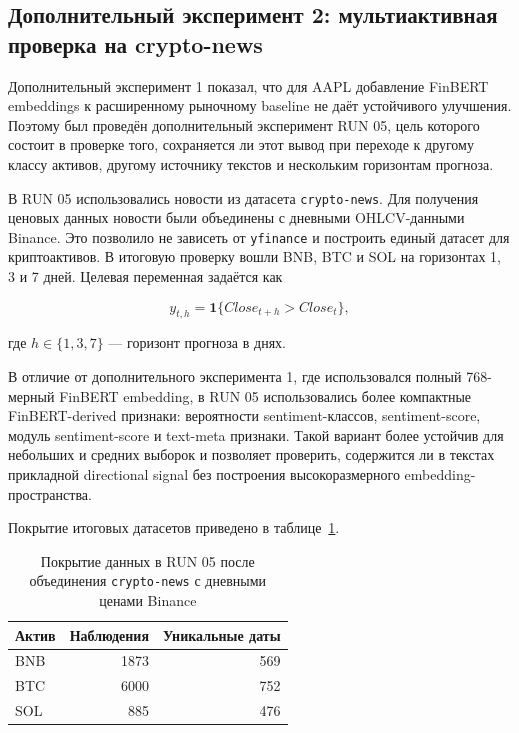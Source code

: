 \subsection{Дополнительный эксперимент 2: мультиактивная проверка на crypto-news}

Дополнительный эксперимент 1 показал, что для AAPL добавление FinBERT embeddings к расширенному рыночному baseline не даёт устойчивого улучшения. Поэтому был проведён дополнительный эксперимент RUN 05, цель которого состоит в проверке того, сохраняется ли этот вывод при переходе к другому классу активов, другому источнику текстов и нескольким горизонтам прогноза.

В RUN 05 использовались новости из датасета \texttt{crypto-news}. Для получения ценовых данных новости были объединены с дневными OHLCV-данными Binance. Это позволило не зависеть от \texttt{yfinance} и построить единый датасет для криптоактивов. В итоговую проверку вошли BNB, BTC и SOL на горизонтах 1, 3 и 7 дней. Целевая переменная задаётся как

\[
y_{t,h}=\mathbf{1}\{Close_{t+h}>Close_t\},
\]

где $h \in \{1,3,7\}$ --- горизонт прогноза в днях.

В отличие от дополнительного эксперимента 1, где использовался полный 768-мерный FinBERT embedding, в RUN 05 использовались более компактные FinBERT-derived признаки: вероятности sentiment-классов, sentiment-score, модуль sentiment-score и text-meta признаки. Такой вариант более устойчив для небольших и средних выборок и позволяет проверить, содержится ли в текстах прикладной directional signal без построения высокоразмерного embedding-пространства.

Покрытие итоговых датасетов приведено в таблице~\ref{tab:run05_coverage}.

\begin{table}[htbp]
\centering
\begin{tabular}{lrr}
\toprule
Актив & Наблюдения & Уникальные даты \\
\midrule
BNB & 1873 & 569 \\
BTC & 6000 & 752 \\
SOL & 885 & 476 \\
\bottomrule
\end{tabular}
\caption{Покрытие данных в RUN 05 после объединения \texttt{crypto-news} с дневными ценами Binance}
\label{tab:run05_coverage}
\end{table}


